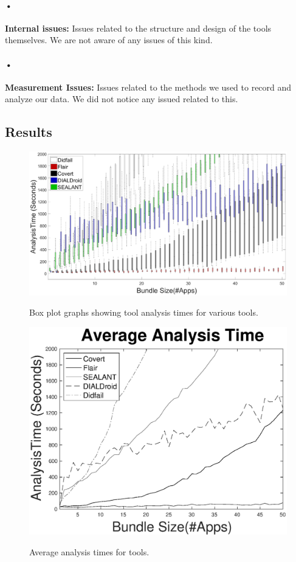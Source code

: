 \documentclass[twocolumn]{article}
\begin{document}
\paragraph{•}
	\textbf{Internal issues:} Issues related to the structure and design of the tools themselves. We are not aware of any issues of this kind.
\paragraph{•}
	\textbf{Measurement Issues:} Issues related to the methods we used to record and analyze our data. We did not notice any issued related to this.
	
\clearpage
\newpage

\subsection{Results}

\begin{figure}[t]

\centering
	\includegraphics[width=\linewidth]{BoxPlotGraph}
	\label{figure:1}
	\caption{Box plot graphs showing tool analysis times for various tools.}
\end{figure}


	\begin{figure}[H]
		\includegraphics[width=\linewidth]{AverageGraph}
		\label{figure:2}
		\caption{Average analysis times for tools.}
	\end{figure}
	
\end{document}

